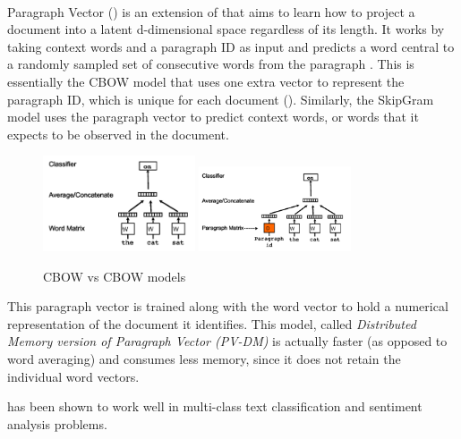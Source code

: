 \paragraph{\doctovec}
Paragraph Vector (\doctovec) is an extension of \wordtovec that aims to learn how to project a document into a latent d-dimensional space regardless of its length. It works by taking context words and a paragraph ID as input and predicts a word central to a randomly sampled set of consecutive words from the paragraph \citep{Lau:Baldwin:2016b}. This is essentially the \wordtovec CBOW model that uses one extra vector to represent the paragraph ID, which is unique for each document (). Similarly, the \doctovec SkipGram model uses the paragraph vector to predict context words, or words that it expects to be observed in the document.
\begin{figure}[h!]
\begin{center}
\includegraphics[width=0.4\textwidth]{Figures/w2vCBOW.PNG}
\includegraphics[width=0.4\textwidth]{Figures/d2vCBOW.PNG}
\caption{\wordtovec CBOW vs \doctovec CBOW models \citep{Le2014}}
\label{fig:d2vVSw2v}
\end{center}
\end{figure}
This paragraph vector is trained along with the word vector to hold a numerical representation of the document it identifies. This model, called \textit{Distributed Memory version of Paragraph Vector (PV-DM)} is actually faster (as opposed to \wordtovec word averaging) and consumes less memory, since it does not retain the individual word vectors.

\doctovec has been shown to work well in multi-class text classification and sentiment analysis problems.


